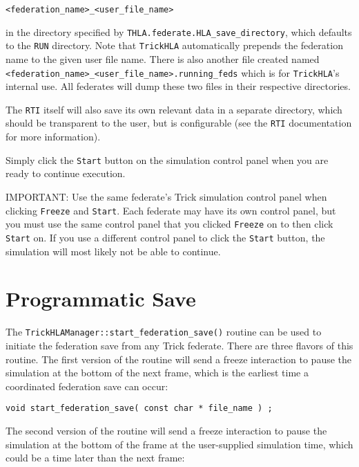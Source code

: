 \begin{verbatim}
<federation_name>_<user_file_name>
\end{verbatim}

in the directory specified by {\tt THLA.federate.HLA\_save\_directory}, which defaults to the {\tt RUN}
directory. Note that {\tt TrickHLA} automatically prepends the federation name to the given user file name.
There is also another file created named {\tt <federation\_name>\_<user\_file\_name>.running\_feds} which
is for {\tt TrickHLA}'s internal use. All federates will dump these two files in their respective directories.

The {\tt RTI} itself will also save its own relevant data in a separate directory, which should be transparent to the user, 
but is configurable (see the {\tt RTI} documentation for more information).

Simply click the {\tt Start} button on the simulation control panel when you are ready to continue execution.

IMPORTANT: Use the same federate's Trick simulation control panel when clicking {\tt Freeze} and {\tt Start}.
Each federate may have its own control panel, but you must use the same control panel that you clicked {\tt Freeze}
on to then click {\tt Start} on. If you use a different control panel to click the {\tt Start} button, the simulation will most
likely not be able to continue.

\section{Programmatic Save }
\label{sec:prog_save}

The {\tt TrickHLAManager::start\_federation\_save()}
routine can be used to initiate the federation
save from any Trick federate.  There are three flavors of this routine.
The first version of the routine will send a freeze interaction to pause the
simulation at the bottom of the next frame, which is the earliest time a
coordinated federation save can occur:

\begin{verbatim}
void start_federation_save( const char * file_name ) ;
\end{verbatim}

The second version of the routine will send a freeze interaction to pause the
simulation at the bottom of the frame at the user-supplied simulation time,
which could be a time later than the next frame:

